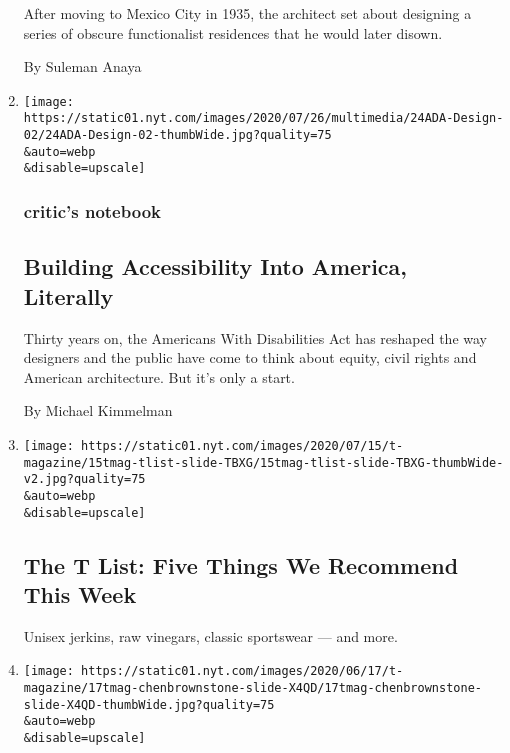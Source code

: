 \begin{enumerate}
  After moving to Mexico City in 1935, the architect set about designing
  a series of obscure functionalist residences that he would later
  disown.

  By Suleman Anaya
\item
  \href{/2020/07/20/arts/disabilities-architecture-design.html}{}

  \texttt{[image: https://static01.nyt.com/images/2020/07/26/multimedia/24ADA-Design-02/24ADA-Design-02-thumbWide.jpg?quality=75\\\&auto=webp\\\&disable=upscale]}

  \hypertarget{critics-notebook-1}{%
  \subsubsection{critic's notebook}\label{critics-notebook-1}}

  \hypertarget{building-accessibility-into-america-literally}{%
  \subsection{Building Accessibility Into America,
  Literally}\label{building-accessibility-into-america-literally}}

  Thirty years on, the Americans With Disabilities Act has reshaped the
  way designers and the public have come to think about equity, civil
  rights and American architecture. But it's only a start.

  By Michael Kimmelman
\item
  \href{/2020/07/16/t-magazine/margo-price-album-tlist.html}{}

  \texttt{[image: https://static01.nyt.com/images/2020/07/15/t-magazine/15tmag-tlist-slide-TBXG/15tmag-tlist-slide-TBXG-thumbWide-v2.jpg?quality=75\\\&auto=webp\\\&disable=upscale]}

  \hypertarget{the-t-list-five-things-we-recommend-this-week-1}{%
  \subsection{The T List: Five Things We Recommend This
  Week}\label{the-t-list-five-things-we-recommend-this-week-1}}

  Unisex jerkins, raw vinegars, classic sportswear --- and more.
\item
  \href{/2020/07/13/t-magazine/brownstone-brooklyn-design.html}{}

  \texttt{[image: https://static01.nyt.com/images/2020/06/17/t-magazine/17tmag-chenbrownstone-slide-X4QD/17tmag-chenbrownstone-slide-X4QD-thumbWide.jpg?quality=75\\\&auto=webp\\\&disable=upscale]}


\end{enumerate}
